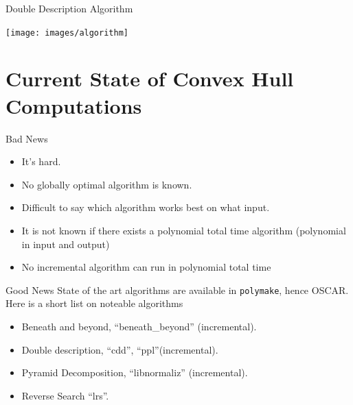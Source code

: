 \documentclass[9pt]{beamer}
\theoremstyle{definition}
\begin{document}
\begin{frame}[fragile]{Double Description Algorithm}
  \begin{center}
    \texttt{[image: images/algorithm]}
  \end{center}
\end{frame}


\section{Current State of Convex Hull Computations}

\begin{frame}[fragile]{Bad News}
  \begin{itemize}
  \item It's hard.
  \item No globally optimal algorithm is known.
  \item Difficult to say which algorithm works best on what input.
  \item It is not known if there exists a polynomial total time algorithm (polynomial in input and output)
  \item No incremental algorithm can run in polynomial total time
  \end{itemize}
\end{frame}




\begin{frame}[fragile]{Good News}
  State of the art algorithms are available in \texttt{polymake}, hence OSCAR.
  Here is a short list on noteable algorithms 
  \begin{itemize}
  \item Beneath and beyond, ``beneath\_beyond'' (incremental).
  \item Double description, ``cdd'', ``ppl''(incremental).
  \item Pyramid Decomposition, ``libnormaliz'' (incremental).
  \item Reverse Search ``lrs''.
      
  \end{itemize}
\end{frame}
\end{document}
